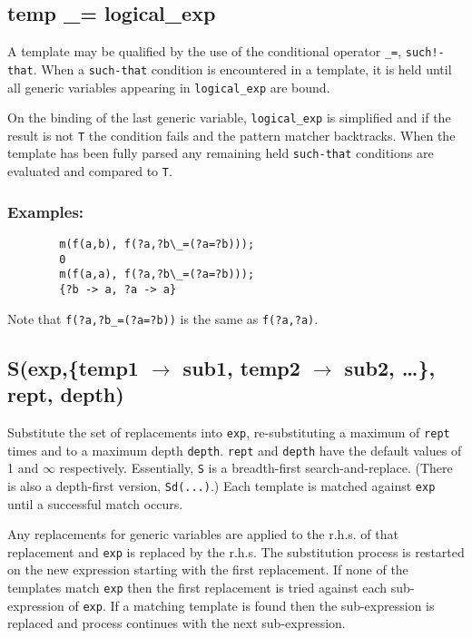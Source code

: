 \subsection{temp \_= logical\_exp} 

A template may be qualified by the use of the conditional operator \texttt{\_=},
\texttt{such!-that}.  When a \texttt{such-that} condition is encountered in a template, it
is held until all generic variables appearing in \texttt{logical\_exp} are bound.

On the binding of the last generic variable, \texttt{logical\_exp} is simplified
and if the result is not \texttt{T} the condition fails and the pattern matcher
backtracks.  When the template has been fully parsed any remaining
held \texttt{such-that} conditions are evaluated and compared to \texttt{T}.

\subsubsection*{Examples:}

\begin{verbatim}
        m(f(a,b), f(?a,?b\_=(?a=?b)));
        0
        m(f(a,a), f(?a,?b\_=(?a=?b)));
        {?b -> a, ?a -> a}
\end{verbatim}
Note that \texttt{f(?a,?b\_=(?a=?b))} is the same as \texttt{f(?a,?a)}.


\subsection[S(exp,\{temp1 -> sub1, temp2 -> sub2, \ldots\}, rept, depth)]{S(exp,\{temp1 $\to$ sub1, temp2 $\to$ sub2, \ldots\}, rept, depth)}

Substitute the set of replacements into \texttt{exp}, re-substituting a maximum
of \texttt{rept} times and to a maximum depth \texttt{depth}. \texttt{rept} and
\texttt{depth} have the default values of 1 and $\infty$ respectively.
Essentially, \texttt{S} is a breadth-first search-and-replace.  (There is also a
depth-first version, \texttt{Sd(...)}.)  Each template is matched against
\texttt{exp} until a successful match occurs.

Any replacements for generic variables are applied to the r.h.s. of that
replacement and \texttt{exp} is replaced by the r.h.s.  The substitution process
is restarted on the new expression starting with the first replacement.  If none
of the templates match \texttt{exp} then the first replacement is tried against
each sub-expression of \texttt{exp}. If a matching template is found then the
sub-expression is replaced and process continues with the next sub-expression.

